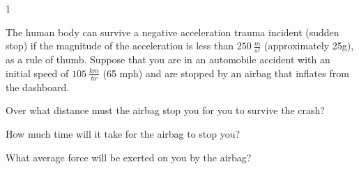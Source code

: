 
\AddToShipoutPicture*{\BackgroundPic}

\addtocounter {ProbNum} {1}

 
{\bf \Large{}} The human body can survive a negative acceleration trauma incident (sudden stop) if the magnitude of the acceleration is less than ${250~\tfrac{m}{s^2}}$ (approximately 25g), as a rule of thumb. Suppose that you are in an automobile accident with an initial speed of ${105~\tfrac{km}{hr}}$ (65 mph) and are stopped by an airbag that inflates from the dashboard. 

\bigskip
Over what distance must the airbag stop you for you to survive the crash?

\vfill
How much time will it take for the airbag to stop you?

\vfill
What average force will be exerted on you by the airbag?

\vfill
\newpage
